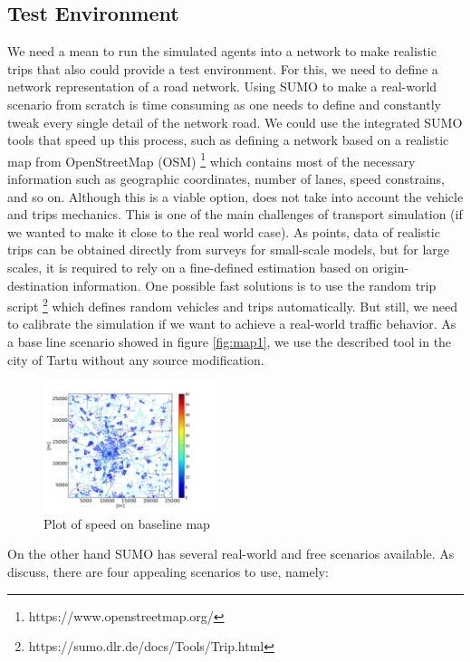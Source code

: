 \documentclass[letter, 10pt, conference]{ieeeconf}
\begin{document}
\subsection{Test Environment}

We need a mean to run the simulated agents into a network to make realistic trips that also could provide a test environment.
For this, we need to define a network representation of a road network.
Using SUMO to make a real-world scenario from scratch is time consuming as one needs to define and constantly tweak every single detail of the network road.
We could use the integrated SUMO tools that speed up this process, such as defining a network based on a realistic map from OpenStreetMap (OSM) \footnote{https://www.openstreetmap.org/} which contains most of the necessary information such as geographic coordinates, number of lanes, speed constrains, and so on.
Although this is a viable option, does not take into account the vehicle and trips mechanics.
This is one of the main challenges of transport simulation (if we wanted to make it close to the real world case).
As \cite{hofer_large_2018} points, data of realistic trips can be obtained directly from surveys for small-scale models, but for large scales, it is required to rely on a fine-defined estimation based on origin-destination information.
One possible fast solutions is to use the random trip script \footnote{https://sumo.dlr.de/docs/Tools/Trip.html} which defines random vehicles and trips automatically.
But still, we need to calibrate the simulation if we want to achieve a real-world traffic behavior.
As a base line scenario showed in figure \ref{fig:map1}, we use the described tool in the city of Tartu without any source modification.

\begin{figure}[h]
  \centering
  \includegraphics[width=0.45\textwidth]{map_speeds_1}
  \caption{Plot of speed on baseline map}
  \label{fig:map_speeds_1}
\end{figure}


On the other hand SUMO has several real-world and free scenarios available.
As \cite{heisig_bridging_nodate} discuss, there are four appealing scenarios to use, namely:
\end{document}
